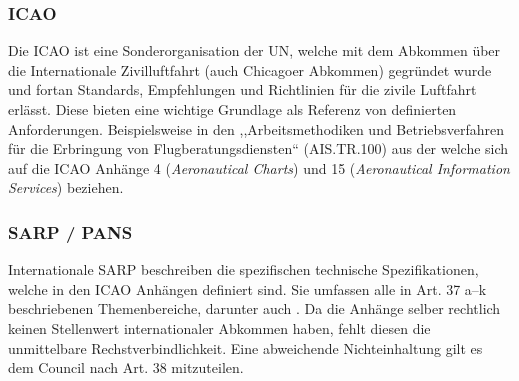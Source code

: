 \subsubsection{ICAO}
Die \acf{ICAO} ist eine Sonderorganisation der \acf{UN}, welche mit dem Abkommen über die Internationale Zivilluftfahrt (auch Chicagoer Abkommen) gegründet wurde und fortan Standards, Empfehlungen und Richtlinien für die zivile Luftfahrt erlässt. 
Diese bieten eine wichtige Grundlage als Referenz von definierten Anforderungen. 
Beispielsweise in den ,,Arbeitsmethodiken und Betriebsverfahren für die Erbringung von Flugberatungsdiensten`` (\textsf{AIS.TR.100}) aus der  welche sich auf die \ac{ICAO} Anhänge 4 (\textit{Aeronautical Charts}) und 15 (\textit{Aeronautical Information Services}) beziehen.
\cite[Anh. IV]{2017R0373}

\subsubsection{SARP / PANS}



Internationale \acf{SARP} beschreiben die spezifischen technische Spezifikationen, welche in den \ac{ICAO} Anhängen definiert sind.
Sie umfassen alle in Art. 37 a--k beschriebenen Themenbereiche, darunter auch \atmans.  \cite[S. 43f.]{icao_convention}
Da die Anhänge selber rechtlich keinen Stellenwert internationaler Abkommen haben, fehlt diesen die unmittelbare Rechstverbindlichkeit. 
\cite[156--159]{eu_icao_milde}
Eine abweichende Nichteinhaltung gilt es dem Council nach Art. 38 mitzuteilen. \cite[S. 45f.]{icao_convention}

